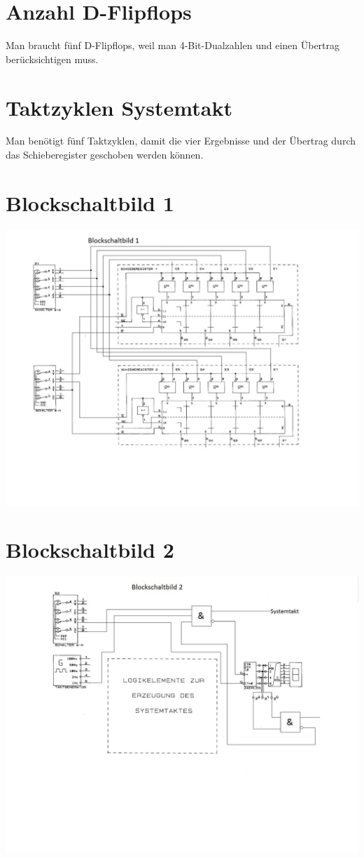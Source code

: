\documentclass[a4paper, 11pt, fleqn, DIV=10, twoside, BCOR=10mm]{scrreprt}
\begin{document}
\section{Anzahl D-Flipflops}
Man braucht fünf D-Flipflops, weil man 4-Bit-Dualzahlen und einen Übertrag berücksichtigen muss.
\section{Taktzyklen Systemtakt}
Man benötigt fünf Taktzyklen, damit die vier Ergebnisse und der Übertrag durch das Schieberegister geschoben werden können.
\begin{center}
\newpage
\end{center}
\section{Blockschaltbild 1}
\includegraphics[width=1.35\columnwidth]{DT2Graphics/Blockschaltbild1.jpeg}
\section{Blockschaltbild 2}
\includegraphics[width=1.25\columnwidth]{DT2Graphics/Blockschaltbild2.jpeg}
\end{document}
